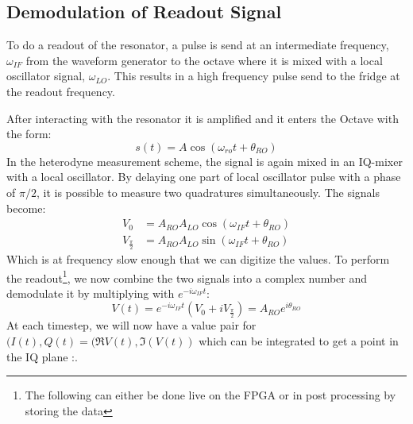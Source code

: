 \subsection{Demodulation of Readout Signal}\label{sec:demodulation}
To do a readout of the resonator, a pulse is send at an intermediate frequency, $\omega_{IF}$ from the waveform generator to the octave where it is mixed with a local oscillator signal, $\omega_{LO}$. This results in a high frequency pulse send to the fridge at the readout frequency.

After interacting with the resonator it is amplified and it enters the Octave with the form:
\begin{equation}
    s(t) = A \cos(\omega_{ro}t + \theta_{RO}) 
\end{equation}
In the heterodyne measurement scheme, the signal is again mixed in an IQ-mixer with a local oscillator. By delaying one part of local oscillator pulse with a phase of $\pi / 2$, it is possible to measure two quadratures simultaneously. The signals become:
\begin{align}
    V_0               &= A_{RO}A_{LO} \cos(\omega_{IF}t + \theta_{RO}) \\
    V_{\frac{\pi}{2}} &= A_{RO}A_{LO} \sin(\omega_{IF}t + \theta_{RO})
\end{align}
Which is at frequency slow enough that we can digitize the values. To perform the readout\footnote{The following can either be done live on the FPGA or in post processing by storing the data}, we now combine the two signals into a complex number and demodulate it by multiplying with $e^{-i\omega_{IF}t}$:
\begin{equation}
    V(t) = e^{-i\omega_{IF} t} (V_0 + i V_{\frac{\pi}{2}}) = A_{RO} e^{i\theta_{RO}}
\end{equation}
At each timestep, we will now have a value pair for $(I(t), Q(t) = (\Re{V(t), \Im(V(t))}$ which can be integrated to get a point in the IQ plane \cite{krantz_quantum_2019}:. 




